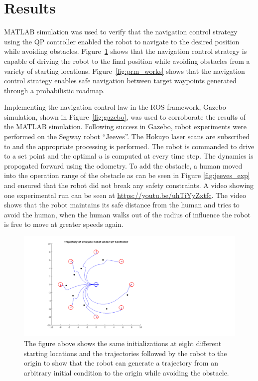 \documentclass[conference]{IEEEtran}
\begin{document}
\section{Results}
MATLAB simulation was used to verify that the navigation control strategy using the QP controller enabled the robot to navigate to the desired position while avoiding obstacles. Figure~\ref{fig:octoplot} shows that the navigation control strategy is capable of driving the robot to the final position while avoiding obstacles from a variety of starting locations. Figure~\ref{fig:prm_works} shows that the navigation control strategy enables safe navigation between target waypoints generated through a probabilistic roadmap.

Implementing the navigation control law in the ROS framework, Gazebo simulation, shown in Figure~\ref{fig:gazebo}, was used to corroborate the results of the MATLAB simulation. Following success in Gazebo, robot experiments were performed on the Segway robot ``Jeeves''. The Hokuyo laser scans are subscribed to and the appropriate processing is performed. The robot is commanded to drive to a set point and the optimal $u$ is computed at every time step. The dynamics is propogated forward using the odometry. To add the obstacle, a human moved into the operation range of the obstacle as can be seen in Figure \ref{fig:jeeves_exp} and ensured that the robot did not break any safety constraints. A video showing one experimental run can be seen at \url {https://youtu.be/uhTiYyZxtfc}. The video shows that the robot maintains its safe distance from the human and tries to avoid the human, when the human walks out of the radius of influence the robot is free to move at greater speeds again.

\begin{figure}[h!]
\centering
\includegraphics[scale=0.3]{octoPlotProofEditSqur.png} 
\caption{The figure above shows the same initializations at eight different starting locations and the trajectories followed by the robot to the origin to show that the robot can generate a trajectory from an arbitrary initial condition to the origin while avoiding the obstacle.\label{fig:octoplot}} 
\end{figure}
\end{document}
